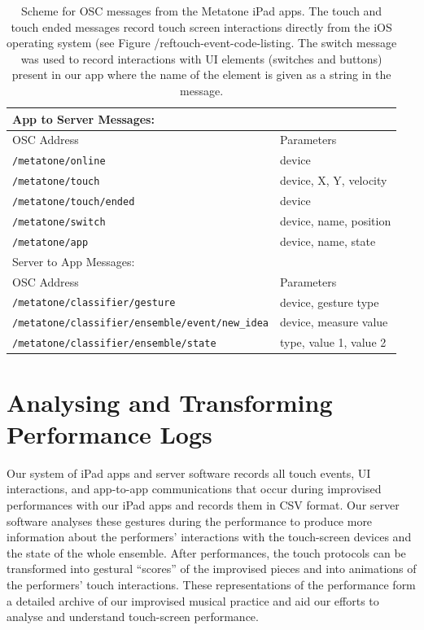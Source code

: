 \documentclass[graybox]{svmult}
\begin{document}
\begin{table}
  \begin{center}
  \begin{tabular}{|l|l|}
  \hline
  App to Server Messages: &\\
  \hline
  OSC Address           & Parameters \\ 
  \hline
  \texttt{/metatone/online}      & device  \\     
  \texttt{/metatone/touch}       & device, X, Y, velocity \\
  \texttt{/metatone/touch/ended} & device \\  
  \texttt{/metatone/switch}      & device, name, position\\
  \texttt{/metatone/app}         & device, name, state\\
  \hline
  Server to App Messages:&\\
  \hline
  OSC Address           & Parameters \\ \hline
  \texttt{/metatone/classifier/gesture} & device, gesture type\\
  \texttt{/metatone/classifier/ensemble/event/new\_idea} & device, measure value\\
  \texttt{/metatone/classifier/ensemble/state} & type, value 1, value 2 \\
  \hline
  \end{tabular}
\end{center}
  \caption{Scheme for OSC messages from the Metatone iPad apps. The
    touch and touch ended messages record touch screen interactions
    directly from the iOS operating system (see Figure /ref{touch-event-code-listing}. The
    switch message was used to record interactions with UI elements
    (switches and buttons) present in our app where the name of the
    element is given as a string in the message.}
  \label{oscschema} 
\end{table}

\section{Analysing and Transforming Performance Logs}
\label{sec:analysis}

Our system of iPad apps and server software records all touch events,
UI interactions, and app-to-app communications that occur during
improvised performances with our iPad apps and records them in CSV
format. Our server software analyses these gestures during the
performance to produce more information about the performers'
interactions with the touch-screen devices and the state of the whole
ensemble. After performances, the touch protocols can be transformed
into gestural ``scores'' of the improvised pieces and into animations
of the performers' touch interactions. These representations of the
performance form a detailed archive of our improvised musical practice
and aid our efforts to analyse and understand touch-screen performance.
\end{document}
